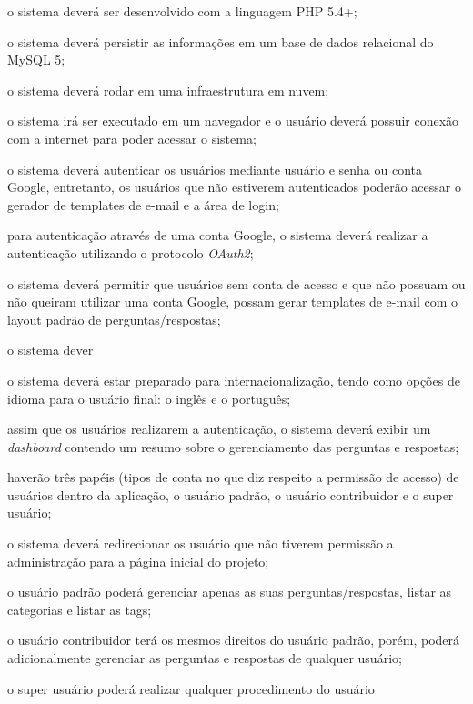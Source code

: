 \begin{alineas}
	\item o sistema deverá ser desenvolvido com a linguagem PHP 5.4+;
	\item o sistema deverá persistir as informações em um base de dados relacional
	do MySQL 5;
	\item o sistema deverá rodar em uma infraestrutura em nuvem;
	\item o sistema irá ser executado em um navegador e o usuário deverá possuir
	conexão com a internet para poder acessar o sistema;
	\item o sistema deverá autenticar os usuários mediante usuário e senha ou
	conta Google, entretanto, os usuários que não estiverem autenticados poderão
	acessar o gerador de templates de e-mail e a área de login;
	\item para autenticação através de uma conta Google, o sistema deverá realizar
	a autenticação utilizando o protocolo \textit{OAuth2};
	\item o sistema deverá permitir que usuários sem conta de acesso e que não
	possuam ou não queiram utilizar uma conta Google, possam gerar templates de
	e-mail com o layout padrão de perguntas/respostas;
    \item o sistema dever
    \item o sistema deverá estar preparado para internacionalização, tendo como
    opções de idioma para o usuário final: o inglês e o português;
    \item assim que os usuários realizarem a autenticação, o sistema deverá
    exibir um \textit{dashboard} contendo um resumo sobre o gerenciamento das
    perguntas e respostas;
    \item haverão três papéis (tipos de conta no que diz respeito a permissão
    de acesso) de usuários dentro da aplicação, o usuário padrão, o usuário
    contribuidor e o super usuário;
    \item o sistema deverá redirecionar os usuário que não tiverem permissão a
    administração para a página inicial do projeto;
    \item o usuário padrão poderá gerenciar apenas as suas perguntas/respostas,
    listar as categorias e listar as tags;
    \item o usuário contribuidor terá os mesmos direitos do usuário padrão,
    porém, poderá adicionalmente gerenciar as perguntas e respostas de qualquer
    usuário;
    \item o super usuário poderá realizar qualquer procedimento do usuário

\end{alineas}
